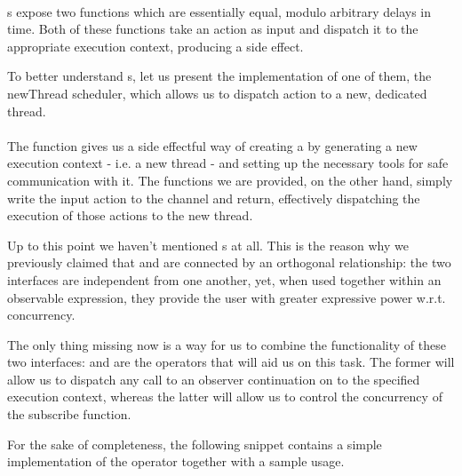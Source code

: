 \\

s expose two functions which are essentially equal, modulo arbitrary delays in time. Both of these functions take an  action as input and dispatch it to the appropriate execution context, producing a side effect. 

To better understand s, let us present the implementation of one of them, the newThread scheduler, which allows us to dispatch action to a new, dedicated thread.\\

\\

The  function gives us a side effectful way of creating a  by generating a new execution context - i.e. a new thread - and setting up the necessary tools for safe communication with it. The  functions we are provided, on the other hand, simply write the input  action to the channel and return, effectively dispatching the execution of those actions to the new thread. 

Up to this point we haven't mentioned s at all. This is the reason why we previously claimed that  and  are connected by an orthogonal relationship: the two interfaces are independent from one another, yet, when used together within an observable expression, they provide the user with greater expressive power w.r.t. concurrency. 

The only thing missing now is a way for us to combine the functionality of these two interfaces:  and  are the operators that will aid us on this task. The former will allow us to dispatch any call to an observer continuation on to the specified execution context, whereas the latter will allow us to control the concurrency of the  subscribe function.

For the sake of completeness, the following snippet contains a simple implementation of the  operator together with a sample usage.\\

\\

\\



